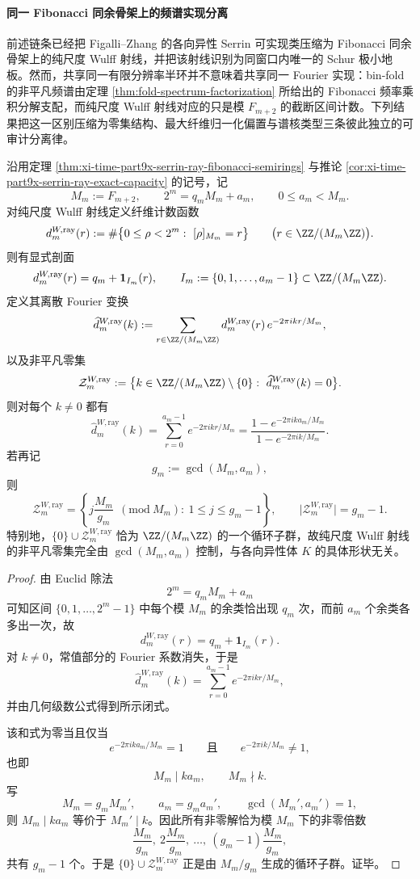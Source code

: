 \paragraph{同一 Fibonacci 同余骨架上的频谱实现分离}
前述链条已经把 Figalli--Zhang 的各向异性 Serrin 可实现类压缩为 Fibonacci 同余骨架上的纯尺度 Wulff 射线，并把该射线识别为同窗口内唯一的 Schur 极小地板。然而，共享同一有限分辨率半环并不意味着共享同一 Fourier 实现：bin-fold 的非平凡频谱由定理 \ref{thm:fold-spectrum-factorization} 所给出的 Fibonacci 频率乘积分解支配，而纯尺度 Wulff 射线对应的只是模 \(F_{m+2}\) 的截断区间计数。下列结果把这一区别压缩为零集结构、最大纤维归一化偏置与谱核类型三条彼此独立的可审计分离律。

\begin{theorem}\label{thm:xi-time-part9xaab-wulff-ray-fourier-zero-formula}
沿用定理 \ref{thm:xi-time-part9x-serrin-ray-fibonacci-semirings} 与推论 \ref{cor:xi-time-part9x-serrin-ray-exact-capacity} 的记号，记
\[
M_m:=F_{m+2},
\qquad
2^m=q_mM_m+a_m,
\qquad
0\le a_m<M_m.
\]
对纯尺度 Wulff 射线定义纤维计数函数
\[
d_m^{W,\mathrm{ray}}(r)
:=
\#\bigl\{0\le \rho<2^m:\ [\rho]_{M_m}=r\bigr\}
\qquad
\bigl(r\in \ZZ/(M_m\ZZ)\bigr).
\]
则有显式剖面
\[
d_m^{W,\mathrm{ray}}(r)=q_m+\mathbf 1_{I_m}(r),
\qquad
I_m:=\{0,1,\dots,a_m-1\}\subset \ZZ/(M_m\ZZ).
\]
定义其离散 Fourier 变换
\[
\widehat d_m^{W,\mathrm{ray}}(k)
:=
\sum_{r\in \ZZ/(M_m\ZZ)}
d_m^{W,\mathrm{ray}}(r)\,
e^{-2\pi i kr/M_m},
\]
以及非平凡零集
\[
\mathcal Z_m^{W,\mathrm{ray}}
:=
\bigl\{k\in \ZZ/(M_m\ZZ)\setminus\{0\}:\ \widehat d_m^{W,\mathrm{ray}}(k)=0\bigr\}.
\]
则对每个 \(k\neq 0\) 都有
\[
\widehat d_m^{W,\mathrm{ray}}(k)
=
\sum_{r=0}^{a_m-1}e^{-2\pi i kr/M_m}
=
\frac{1-e^{-2\pi i ka_m/M_m}}{1-e^{-2\pi i k/M_m}}.
\]
若再记
\[
g_m:=\gcd(M_m,a_m),
\]
则
\[
\mathcal Z_m^{W,\mathrm{ray}}
=
\left\{
j\frac{M_m}{g_m}\ \ (\mathrm{mod}\ M_m):\ 1\le j\le g_m-1
\right\},
\qquad
\bigl|\mathcal Z_m^{W,\mathrm{ray}}\bigr|=g_m-1.
\]
特别地，\(\{0\}\cup \mathcal Z_m^{W,\mathrm{ray}}\) 恰为 \(\ZZ/(M_m\ZZ)\) 的一个循环子群，故纯尺度 Wulff 射线的非平凡零集完全由 \(\gcd(M_m,a_m)\) 控制，与各向异性体 \(K\) 的具体形状无关。
\end{theorem}
\begin{proof}
由 Euclid 除法
\[
2^m=q_mM_m+a_m
\]
可知区间 \(\{0,1,\dots,2^m-1\}\) 中每个模 \(M_m\) 的余类恰出现 \(q_m\) 次，而前 \(a_m\) 个余类各多出一次，故
\[
d_m^{W,\mathrm{ray}}(r)=q_m+\mathbf 1_{I_m}(r).
\]
对 \(k\neq 0\)，常值部分的 Fourier 系数消失，于是
\[
\widehat d_m^{W,\mathrm{ray}}(k)
=
\sum_{r=0}^{a_m-1}e^{-2\pi i kr/M_m},
\]
并由几何级数公式得到所示闭式。

该和式为零当且仅当
\[
e^{-2\pi i ka_m/M_m}=1
\qquad\text{且}\qquad
e^{-2\pi i k/M_m}\neq 1,
\]
也即
\[
M_m\mid ka_m,
\qquad
M_m\nmid k.
\]
写
\[
M_m=g_mM_m',
\qquad
a_m=g_ma_m',
\qquad
\gcd(M_m',a_m')=1,
\]
则 \(M_m\mid ka_m\) 等价于 \(M_m'\mid k\)。因此所有非零解恰为模 \(M_m\) 下的非零倍数
\[
\frac{M_m}{g_m},
\ 2\frac{M_m}{g_m},
\ \dots,
\ (g_m-1)\frac{M_m}{g_m},
\]
共有 \(g_m-1\) 个。于是 \(\{0\}\cup \mathcal Z_m^{W,\mathrm{ray}}\) 正是由 \(M_m/g_m\) 生成的循环子群。证毕。
\end{proof}

